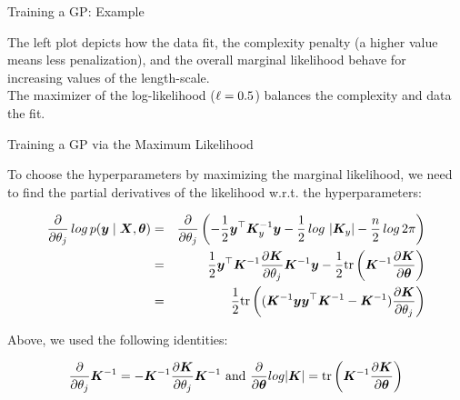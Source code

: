 \begin{frame}[c,allowframebreaks]{Training a GP: Example}
\begin{footnotesize}
\textcolor{blue}{\faInfoCircle} The left plot depicts how the data fit, the complexity penalty (a higher value means less penalization), and the overall marginal likelihood behave for increasing values of the length-scale.\\
\vspace{3mm}
\textcolor{blue}{\faLightbulbO} The maximizer of the log-likelihood ($\ell = 0.5$) balances the complexity and data the fit.
\end{footnotesize}


\end{frame}

\begin{frame}[c,allowframebreaks]{Training a GP via the Maximum Likelihood}

To choose the hyperparameters by maximizing the marginal likelihood, we need to find the partial derivatives of the likelihood w.r.t. the hyperparameters:

\begin{footnotesize}
\begin{eqnarray*}
\frac{\partial}{\partial\theta_j} \, log\,p(\bm{y} \mid \bm{X}, \bm{\theta}) &=& \frac{\partial}{\partial\theta_j}  \left(-\frac{1}{2}\bm{y}^\top\bm{K}_y^{-1} \bm{y} - \frac{1}{2}\,log\, \left| \bm{K}_y \right| - \frac{n}{2} \,log\, 2\pi\right) \\
&=&\frac{1}{2} \bm{y}^\top \bm{K}^{-1} \frac{\partial \bm{K}}{\partial \theta_j}\bm{K}^{-1} \bm{y} - \frac{1}{2} \text{tr}\left(\bm{K}^{-1} \frac{\partial \bm{K}}{\partial \bm{\theta}} \right) \\
&=& \frac{1}{2} \text{tr}\left((\bm{K}^{-1}\bm{y}\bm{y}^\top\bm{K}^{-1} - \bm{K}^{-1})\frac{\partial\bm{K}}{\partial\theta_j}\right)
\end{eqnarray*}
\end{footnotesize}

\textcolor{blue}{\faLightbulbO} Above, we used the following identities:
\begin{footnotesize}
$$\frac{\partial}{\partial \theta_j} \bm{K}^{-1} = - \bm{K}^{-1} \frac{\partial \bm{K}}{\partial \theta_j}\bm{K}^{-1}\text{ and } \frac{\partial}{\partial \bm{\theta}} log  |\bm{K}| = \text{tr}\left(\bm{K}^{-1} \frac{\partial \bm{K}}{\partial \bm{\theta}} \right)$$
\end{footnotesize}
\framebreak



\end{frame}
